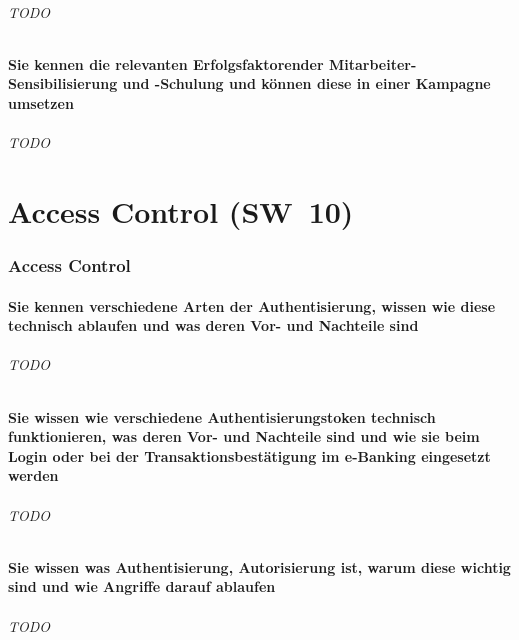 \documentclass[10pt,a4paper]{article}
\begin{document}
\paragraph*{TODO}

\subsection*{Sie kennen die relevanten Erfolgsfaktorender Mitarbeiter-Sensibilisierung und -Schulung und können diese in einer Kampagne umsetzen}
\paragraph*{TODO}


\part{Access Control (SW~10)}
\section{Access Control}
\subsection*{Sie kennen verschiedene Arten der Authentisierung, wissen wie diese technisch ablaufen und was deren Vor- und Nachteile sind}
\paragraph*{TODO}

\subsection*{Sie wissen wie verschiedene Authentisierungstoken technisch funktionieren, was deren Vor- und Nachteile sind und wie sie beim Login oder bei der Transaktionsbestätigung im e-Banking eingesetzt werden}
\paragraph*{TODO}

\subsection*{Sie wissen was Authentisierung, Autorisierung ist, warum diese wichtig sind und wie Angriffe darauf ablaufen}
\paragraph*{TODO}
\end{document}
